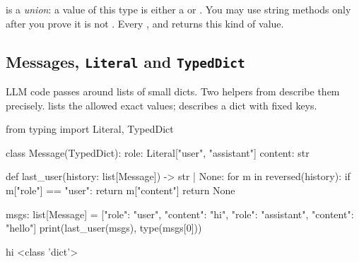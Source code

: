 \begin{center}
\end{center}

\begin{typecheck}
 is a \emph{union}: a value of this type is either a  or . You may use string methods
only after you prove it is not . Every ,  and
 returns this kind of value.
\end{typecheck}

\subsection{Messages, \texttt{Literal} and \texttt{TypedDict}}

LLM code passes around lists of small dicts. Two helpers from  describe them precisely.
 lists the allowed exact values;  describes a dict with fixed keys.

\begin{pycode}
from typing import Literal, TypedDict

class Message(TypedDict):
    role: Literal["user", "assistant"]
    content: str

def last_user(history: list[Message]) -> str | None:
    for m in reversed(history):
        if m["role"] == "user":
            return m["content"]
    return None

msgs: list[Message] = [{"role": "user", "content": "hi"},
                       {"role": "assistant", "content": "hello"}]
print(last_user(msgs), type(msgs[0]))
\end{pycode}
\begin{rawcode}
hi <class 'dict'>
\end{rawcode}

